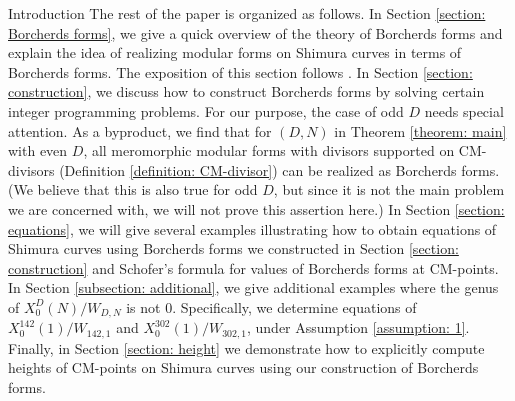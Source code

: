 \documentclass{amsart}
\theoremstyle{definition}
\begin{document}
\begin{section}{Introduction}
The rest of the paper is organized as follows. In Section
\ref{section: Borcherds forms}, we give a quick overview of the theory of
Borcherds forms and explain the idea of realizing modular forms on
Shimura curves in terms of Borcherds forms. The exposition of
this section follows \cite{Yang-CM}. In Section
\ref{section: construction}, we discuss how to
construct Borcherds forms by solving certain integer programming
problems. For our purpose, the case of odd $D$ needs special
attention. As a byproduct, we find that for $(D,N)$ in Theorem
\ref{theorem: main} with even $D$, all meromorphic modular forms with
divisors supported on CM-divisors (Definition \ref{definition:
  CM-divisor}) can be realized as Borcherds forms. (We believe that
this is also true for odd $D$, but since it is not the main problem we
are concerned with, we will not prove this assertion here.) In Section
\ref{section: equations}, we will give several examples illustrating
how to obtain equations of Shimura curves using Borcherds forms we 
constructed in Section \ref{section: construction} and Schofer's
formula for values of  Borcherds forms at CM-points. In
Section \ref{subsection: additional}, we give additional 
examples where the genus of $X_0^D(N)/W_{D,N}$ is not
$0$. Specifically, we determine equations of $X_0^{142}(1)/W_{142,1}$
and $X_0^{302}(1)/W_{302,1}$, under Assumption \ref{assumption: 1}.
Finally, in Section \ref{section: height} we demonstrate how to
explicitly compute heights of CM-points on Shimura curves using our
construction of Borcherds forms.
\end{section}
\end{document}
